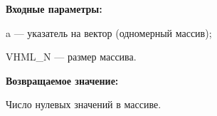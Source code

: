 \textbf{Входные параметры:}

 a --- указатель на вектор (одномерный массив);
 
 VHML\_N --- размер массива.

\textbf{Возвращаемое значение:}

Число нулевых значений в массиве.